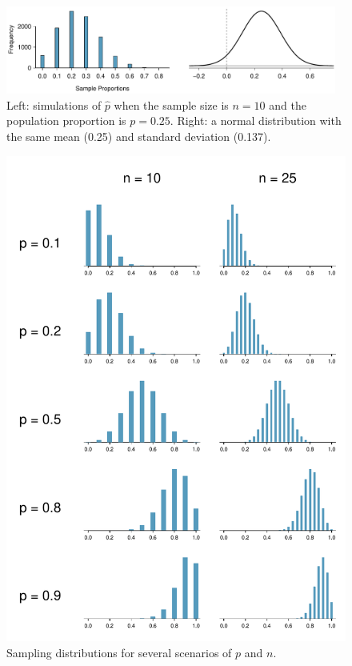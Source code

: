 \begin{figure}[h]
   \centering
   \includegraphics[width=0.97\textwidth]{ch_foundations_for_inf/figures/sampling_10_prop_25p/sampling_10_prop_25p}
   \caption{Left: simulations of $\hat{p}$ when the sample size
       is $n = 10$ and the population proportion is $p = 0.25$.
       Right: a normal distribution with the same mean (0.25)
       and standard deviation (0.137).}
   \label{sampling_10_prop_25p}
\end{figure}

\begin{figure}
   \centering
   \includegraphics[width=\textwidth]{ch_foundations_for_inf/figures/clt_prop_grid/clt_prop_grid_1}
   \caption{Sampling distributions for several scenarios
       of $p$ and $n$. \\ \ }
   \label{clt_prop_grid_1}
\end{figure}


